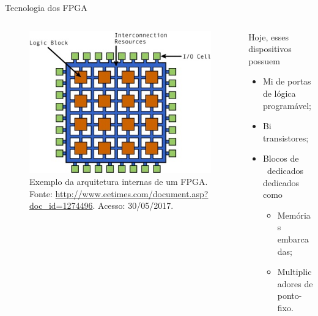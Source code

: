    \begin{frame}{Tecnologia dos FPGA} \vspace{-1em}
      \begin{columns}
         \begin{column}{0.6\textwidth}
            \begin{figure}[h] \centering
               \includegraphics[width=1\textwidth]{img/rt-arch_fpga.jpg}
               \caption{Exemplo da arquitetura internas de um FPGA. Fonte: \url{http://www.eetimes.com/document.asp?doc_id=1274496}. Acesso: 30/05/2017.}
            \end{figure}
         \end{column}
         \begin{column}{0.4\textwidth}
            Hoje, esses dispositivos possuem \cite{Choi2016}
            \begin{itemize}
               \setlength{\itemsep}{1.2em}
               \item Mi de portas de lógica programável;
               \item Bi transistores;
               \item Blocos de \hardware\ dedicados dedicados como
               \begin{itemize}
                  \setlength{\itemsep}{0.8em}
                  \item Memórias embarcadas;
                  \item Multiplicadores de ponto-fixo.
               \end{itemize}
            \end{itemize}
         \end{column}
      \end{columns}
   \end{frame}

